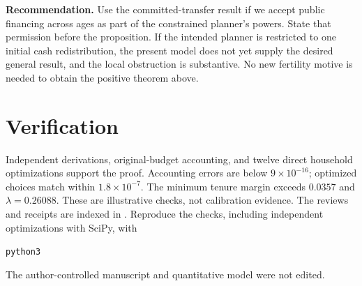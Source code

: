 \documentclass[11pt]{article}
\begin{document}
\textbf{Recommendation.} Use the committed-transfer result if we accept public
financing across ages as part of the constrained planner's powers. State that
permission before the proposition. If the intended planner is restricted to
one initial cash redistribution, the present model does not yet supply the
desired general result, and the local obstruction is substantive. No new
fertility motive is needed to obtain the positive theorem above.

\section{Verification}

Independent derivations, original-budget accounting, and twelve direct
household optimizations support the proof. Accounting errors are below
$9\times10^{-16}$; optimized choices match within $1.8\times10^{-7}$.
The minimum tenure margin exceeds $0.0357$ and $\lambda=0.26088$.
These are illustrative checks, not calibration evidence. The reviews and
receipts are indexed in .
Reproduce the checks, including independent optimizations with SciPy, with
\par\smallskip
{\footnotesize
\texttt{python3}\ \ \par}
The author-controlled manuscript and quantitative model were not edited.
\end{document}
